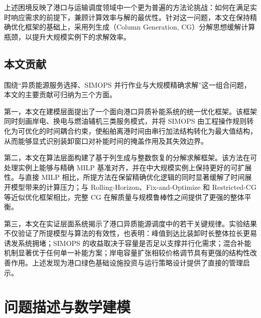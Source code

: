 \documentclass[UTF8, a4paper, 12pt]{ctexart}
\begin{document}
上述困境反映了港口与运输调度领域中一个更为普遍的方法论挑战：如何在满足实时响应需求的前提下，兼顾计算效率与解的最优性。针对这一问题，本文在保持精确优化框架的基础上，采用列生成（Column Generation, CG）分解思想缓解计算瓶颈，以提升大规模实例下的求解效率。

\subsection{本文贡献}
围绕“异质能源服务选择、SIMOPS 并行作业与大规模精确求解”这一组合问题，本文的主要贡献可归纳为三个方面。

第一，本文在建模层面提出了一个面向港口异质补能系统的统一优化框架。该框架同时刻画岸电、换电与燃油辅机三类服务模式，并将 SIMOPS 由工程操作规则转化为可优化的时间耦合约束，使船舶离港时间由串行加法结构转化为最大值结构，从而能够显式识别装卸窗口对补能时间的掩盖作用及其失效边界。

第二，本文在算法层面构建了基于列生成与整数恢复的分解求解框架。该方法在可处理实例上能够与精确 MILP 基准对齐，并在中大规模实例上保持更好的可扩展性。与直接 MILP 相比，所提方法在保留精确优化逻辑的同时显著缓解了时间展开模型带来的计算压力；与 Rolling-Horizon、Fix-and-Optimize 和 Restricted-CG 等近似优化框架相比，完整 CG 在解质量与规模鲁棒性之间提供了更强的整体平衡。

第三，本文在实证层面系统揭示了港口异质能源调度中的若干关键规律。实验结果不仅验证了所提模型与算法的有效性，也表明：峰值到达比装卸时长整体拉长更易诱发系统拥堵；SIMOPS 的收益取决于容量是否足以支撑并行化需求；混合补能机制显著优于任何单一补能方案；岸电容量扩张相较价格调节具有更强的结构性改善作用。上述发现为港口绿色基础设施投资与运行策略设计提供了直接的管理启示。



\section{问题描述与数学建模}
\label{sec:model}
\end{document}
